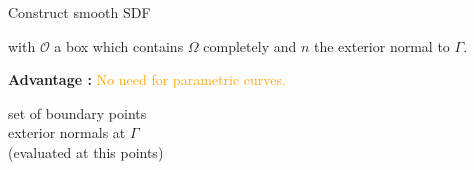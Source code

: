 \begin{frame}[allowframebreaks]{Construct smooth SDF}
\begin{tcolorbox}
			with $\mathcal{O}$ a box which contains $\Omega$ completely and $n$ the exterior normal to $\Gamma$.
		\end{tcolorbox}
		
		\textbf{Advantage :} \textcolor{orange}{No need for parametric curves.}
		
		\begin{minipage}{0.48\linewidth}
			\centering
		\end{minipage} 
		\begin{minipage}{0.48\linewidth}
			 set of boundary points \\
			 exterior normals at $\Gamma$ \\
			(evaluated at this points)
		\end{minipage}
\end{frame}

